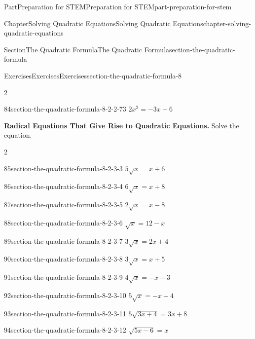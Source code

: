 \documentclass[twoside,10pt,]{book}
\numberwithin{equation}{section}
\begin{document}
\begin{partptx}{Part}{Preparation for STEM}{}{Preparation for STEM}{}{}{part-preparation-for-stem}
\begin{chapterptx}{Chapter}{Solving Quadratic Equations}{}{Solving Quadratic Equations}{}{}{chapter-solving-quadratic-equations}
\begin{sectionptx}{Section}{The Quadratic Formula}{}{The Quadratic Formula}{}{}{section-the-quadratic-formula}
\begin{exercises-subsection}{Exercises}{Exercises}{}{Exercises}{}{}{section-the-quadratic-formula-8}
\begin{exercisegroupcol}{2}
\begin{divisionexerciseegcol}{84}{}{}{section-the-quadratic-formula-8-2-2-73}%
\({2x^{2}}={-3x+6}\)%
\end{divisionexerciseegcol}%
\end{exercisegroupcol}
\par\medskip\noindent
\par\medskip\noindent%
\textbf{Radical Equations That Give Rise to Quadratic Equations.}\space\space%
Solve the equation.%
\begin{exercisegroupcol}{2}
\begin{divisionexerciseegcol}{85}{}{}{section-the-quadratic-formula-8-2-3-3}%
\({5\sqrt{x}}={x+6}\)%
\end{divisionexerciseegcol}%
\begin{divisionexerciseegcol}{86}{}{}{section-the-quadratic-formula-8-2-3-4}%
\({6\sqrt{x}}={x+8}\)%
\end{divisionexerciseegcol}%
\begin{divisionexerciseegcol}{87}{}{}{section-the-quadratic-formula-8-2-3-5}%
\({2\sqrt{x}}={x-8}\)%
\end{divisionexerciseegcol}%
\begin{divisionexerciseegcol}{88}{}{}{section-the-quadratic-formula-8-2-3-6}%
\({\sqrt{x}}={12-x}\)%
\end{divisionexerciseegcol}%
\begin{divisionexerciseegcol}{89}{}{}{section-the-quadratic-formula-8-2-3-7}%
\({3\sqrt{x}}={2x+4}\)%
\end{divisionexerciseegcol}%
\begin{divisionexerciseegcol}{90}{}{}{section-the-quadratic-formula-8-2-3-8}%
\({3\sqrt{x}}={x+5}\)%
\end{divisionexerciseegcol}%
\begin{divisionexerciseegcol}{91}{}{}{section-the-quadratic-formula-8-2-3-9}%
\({4\sqrt{x}}={-x-3}\)%
\end{divisionexerciseegcol}%
\begin{divisionexerciseegcol}{92}{}{}{section-the-quadratic-formula-8-2-3-10}%
\({5\sqrt{x}}={-x-4}\)%
\end{divisionexerciseegcol}%
\begin{divisionexerciseegcol}{93}{}{}{section-the-quadratic-formula-8-2-3-11}%
\({5\sqrt{3x+4}}={3x+8}\)%
\end{divisionexerciseegcol}%
\begin{divisionexerciseegcol}{94}{}{}{section-the-quadratic-formula-8-2-3-12}%
\({\sqrt{5x-6}}={x}\)%

\end{divisionexerciseegcol}
\end{exercisegroupcol}
\end{exercises-subsection}
\end{sectionptx}
\end{chapterptx}
\end{partptx}
\end{document}
